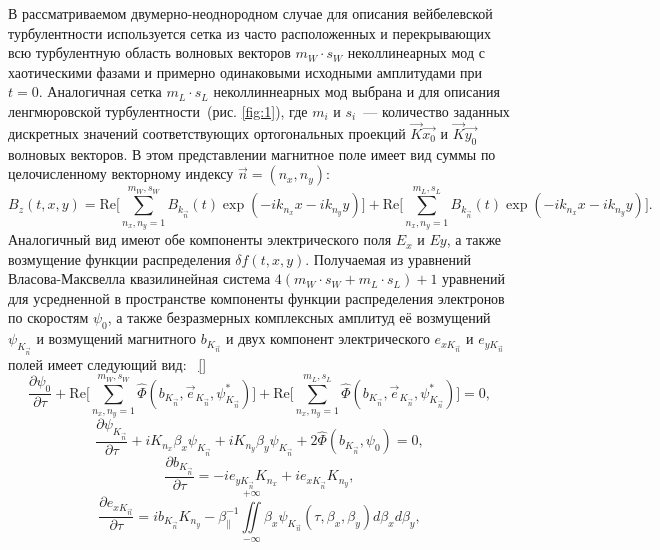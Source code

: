 В рассматриваемом двумерно-неоднородном случае для описания вейбелевской турбулентности используется сетка из часто расположенных и перекрывающих всю турбулентную область волновых векторов $m_W \cdot s_W$ неколлинеарных мод с хаотическими фазами и примерно одинаковыми исходными амплитудами при $t=0$. Аналогичная сетка $m_L \cdot s_L$ неколлиннеарных мод выбрана и для описания ленгмюровской турбулентности~(рис. \ref{fig:1}), где $m_i$ и $s_i$~--- количество заданных дискретных значений соответствующих ортогональных проекций $\vec{K}\vec{x_0}$ и $\vec{K}\vec{y_0}$ волновых векторов. В этом представлении магнитное поле имеет вид суммы по целочисленному векторному индексу $\vec{n}=(n_x,n_y)$:
\begin{equation}
    B_z(t,x,y)= \mathrm{Re} \Biggr[ \sum^{m_W,s_W}_{n_x,n_y=1}B_{k_\vec{n}}(t)\exp(- ik_{n_{x}}x - ik_{n_{y}}y)\Biggr]+ \mathrm{Re} \Biggr[\sum^{m_L,s_L}_{n_x,n_y=1}B_{k_\vec{n}}(t)\exp(- ik_{n_{x}}x - ik_{n_{y}}y)\Biggr].
\end{equation}
Аналогичный вид имеют обе компоненты электрического поля $E_x$ и $Ey$, а также возмущение 
функции распределения $\delta f(t,x,y)$. Получаемая из уравнений Власова-Максвелла квазилинейная система  $4(m_W\cdot s_W+m_L\cdot s_L)+1$ уравнений для усредненной в пространстве компоненты функции распределения электронов по скоростям $\psi_0$,  а также безразмерных комплексных амплитуд её возмущений $\psi_{K_{\vec{n}}}$ и возмущений магнитного $b_{K_{\vec{n}}}$ и двух компонент электрического  $e_{x{K_{\vec{n}}}}$ и $e_{y{K_{\vec{n}}}}$ полей имеет следующий вид:
~\ref{} 
\begin{equation}
\label{eq14}
    \dfrac{\partial \psi_0}{\partial \tau} 
    + \mathrm{Re}\Biggr[\sum\limits^{m_W,s_W}_{n_x,n_y=1} \hat \Phi(b_{K_{\vec{n}}},\overrightarrow{e}_{K_{\vec{n}}},\psi_{K_{\vec{n}}}^*) 
     \Biggr]+ \mathrm{Re}\Biggr[\sum\limits^{m_L,s_L}_{n_x,n_y=1} \hat \Phi(b_{K_{\vec{n}}},\overrightarrow{e}_{K_{\vec{n}}},\psi_{K_{\vec{n}}}^*) 
     \Biggr]=0,
\end{equation}
\begin{equation}
    \label{eq15}
    \dfrac{\partial \psi_{K_{\vec{n}}}}{\partial \tau}+iK_{n_x}\beta_x\psi_{K_{\vec{n}}}+iK_{n_y}\beta_y\psi_{K_{\vec{n}}}+2\hat \Phi(b_{K_{\vec{n}}},\psi_0)=0,
\end{equation}
\begin{equation}
    \dfrac{\partial b_{K_{\vec{n}}}}{\partial \tau}=-ie_{y{K_{\vec{n}}}}K_{n_x}+ie_{x{K_{\vec{n}}}}K_{n_y},
\end{equation}
\begin{equation}
    \dfrac{\partial e_{x{K_{\vec{n}}}}}{\partial \tau}=ib_{K_{\vec{n}}}K_{n_y}-\beta_{\|}^{-1}\iint\limits^{+\infty}_{-\infty}\beta_x\psi_{K_{\vec{n}}}(\tau,\beta_x,\beta_y)d\beta_xd\beta_y,
\end{equation}

